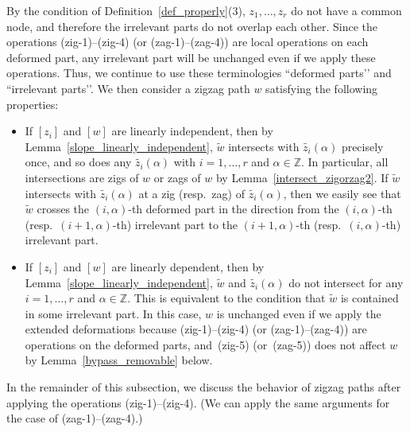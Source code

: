 \documentclass[pdftex]{sigma}%
\numberwithin{equation}{section}
\numberwithin{figure}{section}
\numberwithin{table}{section}
\newcommand{\ZZ}{\mathbb{Z}}
\begin{document}
\begin{observation}
By the condition of Definition~\ref{def_properly}(3), $z_1,\dots,z_r$ do not have a common node, and therefore the irrelevant parts do not overlap each other.
Since the operations (zig-1)--(zig-4) (or (zag-1)--(zag-4)) are local operations on each deformed part, any irrelevant part will be unchanged even if we apply these operations.
Thus, we continue to use these terminologies ``deformed parts’’ and ``irrelevant parts’’.
We then consider a zigzag path $w$ satisfying the following properties:
\begin{itemize}\itemsep=0pt
\item[(a)] If $[z_i]$ and $[w]$ are linearly independent, then by Lemma~\ref{slope_linearly_independent}, $\widetilde{w}$ intersects with $\widetilde{z_i}(\alpha)$ precisely once, and so does any $\widetilde{z_i}(\alpha)$ with $i=1,\dots,r$ and $\alpha\in\ZZ$.
In particular, all intersections are zigs of $w$ or zags of $w$ by Lemma~\ref{intersect_zigorzag2}.
If $\widetilde{w}$ intersects with $\widetilde{z_i}(\alpha)$ at a zig (resp.\ zag) of $\widetilde{z_i}(\alpha)$, then we easily see that $\widetilde{w}$ crosses the $(i,\alpha)$-th deformed part in the direction from the $(i,\alpha)$-th (resp.~$(i+1,\alpha)$-th) irrelevant part to the $(i+1,\alpha)$-th (resp.~$(i,\alpha)$-th) irrelevant part.

\item[(b)] If $[z_i]$ and $[w]$ are linearly dependent, then by Lemma~\ref{slope_linearly_independent}, $\widetilde{w}$ and $\widetilde{z_i}(\alpha)$ do not intersect for any $i=1,\dots,r$ and $\alpha\in\ZZ$.
This is equivalent to the condition that $\widetilde{w}$ is contained in some irrelevant part.
In this case, $w$ is unchanged even if we apply the extended deformations because (zig-1)--(zig-4) (or (zag-1)--(zag-4)) are operations on the deformed parts, and~(zig-5) (or~(zag-5)) does not affect $w$ by Lemma~\ref{bypass_removable} below.
\end{itemize}
\end{observation}

In the remainder of this subsection, we discuss the behavior of zigzag paths after applying the operations (zig-1)--(zig-4).
(We can apply the same arguments for the case of (zag-1)--(zag-4).)
\end{document}

